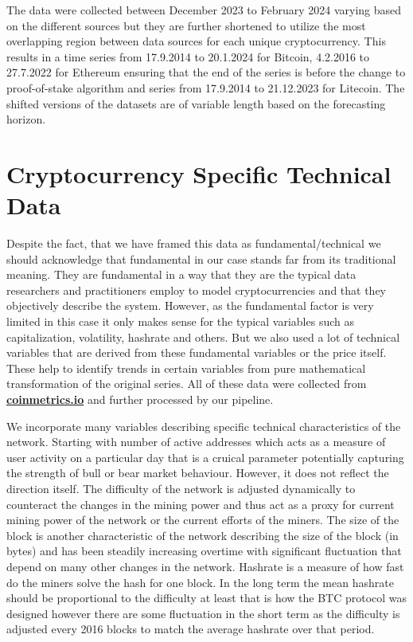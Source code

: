 The data were collected between December 2023 to February 2024 varying 
based on
the different sources but they are further shortened to utilize the most
overlapping region between data sources for each unique cryptocurrency.
This results in a time series from 17.9.2014 to 20.1.2024 for Bitcoin, 4.2.2016
to 27.7.2022 for Ethereum ensuring that the end of the series is 
before the change to proof-of-stake algorithm and series from 17.9.2014 to 21.12.2023
for Litecoin. The shifted versions of the datasets are of variable length based
on the forecasting horizon. 
\section{Cryptocurrency Specific Technical Data}

Despite the fact, that we have framed this data as fundamental/technical 
we should acknowledge that fundamental in our case stands far from its 
traditional meaning. They are fundamental in a way that they 
are the typical data researchers and practitioners employ to model cryptocurrencies
and that they objectively describe the system.
However, as the fundamental factor is very limited in this case it only makes sense
for the typical variables such as capitalization, volatility, hashrate and others.
But we also used a lot of technical variables that are derived from these fundamental
variables or the price itself. These help to identify trends in certain 
variables from pure mathematical transformation of the original series. 
All of these data were collected from \textbf{\href{https://coinmetrics.io/}{coinmetrics.io}}
and further processed by our pipeline.


We incorporate many variables describing specific technical characteristics of the network. Starting with number of active addresses
which acts as a measure of user activity on a particular day that is a cruical parameter potentially capturing the strength of 
bull or bear market behaviour. However, it does not reflect the direction itself. The difficulty of the network is
adjusted dynamically to counteract the changes in the mining power and thus act as a proxy for current mining power of the network or the current efforts of the miners. 
The size of the block is another characteristic of the network describing the size of the block (in bytes) and has been steadily increasing overtime
with significant fluctuation that depend on many other changes in the network. Hashrate is a measure of how
fast do the miners solve the hash for one block. In the long term the mean hashrate should be proportional to the difficulty at least that is how the 
\ac{BTC} protocol was designed however there are some fluctuation in the short term as the difficulty is adjusted every 2016 blocks 
to match the average hashrate over that period.


